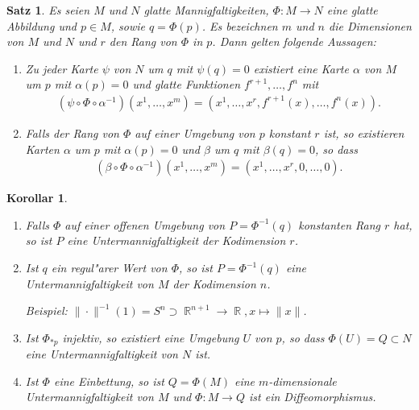 \documentclass[paper=A4, twoside, chapterprefix=true, bibliography=totoc, headsepline]{scrbook}
\DeclareMathOperator{\R}{\mathbb{R}}
\theoremstyle{plain}
\newtheorem{Satz}[Dfn]{Satz}
\newtheorem{Kor}[Dfn]{Korollar}
\theoremstyle{nonumberplain}
\theoremstyle{empty}
\theoremstyle{break}
\begin{document}
\begin{Satz}\label{satz-3-4}
  Es seien $M$ und $N$ glatte Mannigfaltigkeiten, $\Phi \colon M \to N$ eine glatte Abbildung und $p \in M$, sowie $q = \Phi(p)$. Es bezeichnen $m$ und $n$ die Dimensionen von $M$ und $N$ und $r$ den Rang von $\Phi$ in $p$. Dann gelten folgende Aussagen:
  \begin{enumerate}[label=(\roman*),leftmargin=*,widest=ii]
  \item Zu jeder Karte $\psi$ von $N$ um $q$ mit $\psi(q) = 0$ existiert eine Karte $\alpha$ von $M$ um $p$ mit $\alpha(p) = 0$ und glatte Funktionen $f^{r+1},\ldots,f^n$ mit
    \begin{align*}
      \left(\psi \circ \Phi \circ \alpha^{-1}\right)\left(x^1,\ldots, x^m\right) = \left(x^1, \ldots, x^{r}, f^{r+1}(x), \ldots, f^n(x)\right).
    \end{align*}
  \item Falls der Rang von $\Phi$ auf einer Umgebung von $p$ konstant $r$ ist, so existieren Karten $\alpha$ um $p$ mit $\alpha(p) = 0$ und $\beta$ um $q$ mit $\beta(q) = 0$, so dass
    \begin{align*}
      \left(\beta \circ \Phi \circ \alpha^{-1}\right)\left(x^1, \ldots, x^m\right) = \left(x^1, \ldots, x^r, 0, \ldots, 0\right).
    \end{align*}
  \end{enumerate}
\end{Satz} 

\begin{Kor}
  \begin{enumerate}[label=(\roman*),widest=iii,leftmargin=*]
  \item Falls $\Phi$ auf einer offenen Umgebung von $P = \Phi^{-1}(q)$ konstanten Rang $r$ hat, so ist $P$ eine Untermannigfaltigkeit der Kodimension $r$.
  \item Ist $q$ ein regul"arer Wert von $\Phi$, so ist $P = \Phi^{-1}(q)$ eine Untermannigfaltigkeit von $M$ der Kodimension $n$.
  
    Beispiel: $\|\cdot\|^{-1}(1) = S^n \supset \R^{n+1} \to \R, x \mapsto \|x\|$.
  \item Ist $\Phi_{*p}$ injektiv, so existiert eine Umgebung $U$ von $p$, so dass $\Phi(U) = Q \subset N$ eine Untermannigfaltigkeit von $N$ ist.
  \item Ist $\Phi$ eine Einbettung, so ist $Q = \Phi(M)$ eine $m$-dimensionale Untermannigfaltigkeit von $M$ und $\Phi \colon M \to Q$ ist ein Diffeomorphismus.
  \end{enumerate}
\end{Kor}
\end{document}
